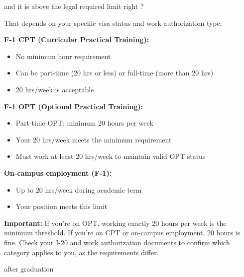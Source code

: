 \begin{userprompt}
and it is above the legal required limit right ?
\end{userprompt}

\begin{botresponse}
That depends on your specific visa status and work authorization type:

\textbf{F-1 CPT (Curricular Practical Training):}

\begin{itemize}
\item No minimum hour requirement
\item Can be part-time (20 hrs or less) or full-time (more than 20 hrs)
\item 20 hrs/week is acceptable
\end{itemize}

\textbf{F-1 OPT (Optional Practical Training):}

\begin{itemize}
\item Part-time OPT: minimum 20 hours per week
\item Your 20 hrs/week meets the minimum requirement
\item Must work at least 20 hrs/week to maintain valid OPT status
\end{itemize}

\textbf{On-campus employment (F-1):}

\begin{itemize}
\item Up to 20 hrs/week during academic term
\item Your position meets this limit
\end{itemize}

\textbf{Important:} If you're on OPT, working exactly 20 hours per week is the minimum threshold. If you're on CPT or on-campus employment, 20 hours is fine. Check your I-20 and work authorization documents to confirm which category applies to you, as the requirements differ.
\end{botresponse}

\begin{userprompt}
after graduation
\end{userprompt}

